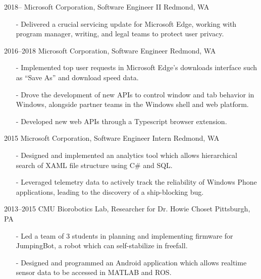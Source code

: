 \documentclass[print]{template/friggeri-cv}
\begin{document}
    \begin{entrylist}
        \entrys
            {2018--}
            {Microsoft Corporation, {\normalfont Software Engineer II}}
            {Redmond, WA}
            {\begin{itemize}[leftmargin=*]
                \item[-] Delivered a crucial servicing update for Microsoft Edge, working with program manager, writing, and legal teams to protect user privacy.
             \end{itemize}}
        \entrys
            {2016--2018}
            {Microsoft Corporation, {\normalfont Software Engineer}}
            {Redmond, WA}
            {\begin{itemize}[leftmargin=*]
                \item[-] Implemented top user requests in Microsoft Edge's downloads interface such as ``Save As'' and download speed data.
                \item[-] Drove the development of new APIs to control window and tab behavior in Windows, alongside partner teams in the Windows shell and web platform.
                \item[-] Developed new web APIs through a Typescript browser extension.
             \end{itemize}}
        \entrys
            {2015}
            {Microsoft Corporation, {\normalfont Software Engineer Intern}}
            {Redmond, WA}
            {\begin{itemize}[leftmargin=*]
                \item[-] Designed and implemented an analytics tool which allows hierarchical search of XAML file structure using C\# and SQL.
                \item[-] Leveraged telemetry data to actively track the reliability of Windows Phone applications, leading to the discovery of a ship-blocking bug.
             \end{itemize}}
        \entrys
            {2013--2015}
            {CMU Biorobotics Lab, {\normalfont Researcher for Dr. Howie Choset}}
            {Pittsburgh, PA}
            {\begin{itemize}[leftmargin=*]
                \item[-] Led a team of 3 students in planning and implementing firmware for JumpingBot, a robot which can self-stabilize in freefall.
                \item[-] Designed and programmed an Android application which allows realtime sensor data to be accessed in MATLAB and ROS.
            \end{itemize}}
    \end{entrylist}
\end{document}
